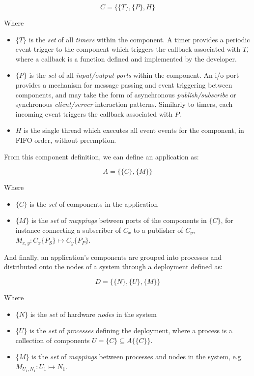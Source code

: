 \begin{equation}
  C = \{\{T\},\{P\},H\}
\end{equation}

Where

\begin{itemize}
\item $\{T\}$ is the \emph{set} of all \emph{timers} within the component.  A
  timer provides a periodic event trigger to the component which
  triggers the callback associated with $T$, where a callback is a
  function defined and implemented by the developer.  
\item $\{P\}$ is the \emph{set} of all \emph{input/output ports} within the
  component.  An i/o port provides a mechanism for message passing and
  event triggering between components, and may take the form of
  asynchronous \emph{publish/subscribe} or synchronous \emph{client/server}
  interaction patterns.  Similarly to timers, each incoming event
  triggers the callback associated with $P$.
\item $H$ is the single thread which executes all event events for
  the component, in FIFO order, without preemption.  
\end{itemize}

From this component definition, we can define an application as:

\begin{equation}
  A = \{\{C\},\{M\}\}
\end{equation}

Where

\begin{itemize}
\item $\{C\}$ is the \emph{set} of components in the application
\item $\{M\}$ is the \emph{set} of \emph{mappings} between ports of
  the components in $\{C\}$, for instance connecting a subscriber of
  $C_x$ to a publisher of $C_y$, $M_{x,y} : C_x\{P_S\}\mapsto
  C_y\{P_P\}$.
\end{itemize}

And finally, an application's components are grouped into processes
and distributed onto the nodes of a system through a deployment
defined as:

\begin{equation}
  D = \{\{N\},\{U\},\{M\}\}
\end{equation}

Where

\begin{itemize}
\item $\{N\}$ is the \emph{set} of hardware \emph{nodes} in the system
\item $\{U\}$ is the \emph{set} of \emph{processes} defining the deployment,
  where a process is a collection of components
  $U=\{C\}\subseteq A\{\{C\}\}$.
\item $\{M\}$ is the \emph{set} of \emph{mappings} between processes and nodes
  in the system, e.g. $M_{U_1,N_1} : U_1\mapsto N_1$.
\end{itemize}


